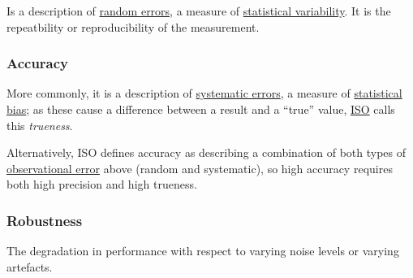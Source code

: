 \documentclass[11pt]{article}
\begin{document}
\begin{figure}[H]
    \center
\end{figure}


Is a description of \href{https://en.wikipedia.org/wiki/Observational_error}{random errors}, a measure of \href{https://en.wikipedia.org/wiki/Statistical_dispersion}{statistical variability}. It is the repeatbility or reproducibility of the measurement.

\subsubsection{Accuracy}

More commonly, it is a description of \href{https://en.wikipedia.org/wiki/Observational_error#Random_errors_versus_systematic_errors}{systematic errors}, a measure of \href{https://en.wikipedia.org/wiki/Bias_(statistics)}{statistical bias}; as these cause a difference between a result and a ``true'' value, \href{https://en.wikipedia.org/wiki/International_Organization_for_Standardization}{ISO} calls this \textit{trueness}.

Alternatively, ISO defines accuracy as describing a combination of both types of \href{https://en.wikipedia.org/wiki/Observational_error}{observational error} above (random and systematic), so high accuracy requires both high precision and high trueness.

\subsubsection{Robustness}

The degradation in performance with respect to varying noise levels or varying artefacts.
\end{document}

